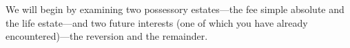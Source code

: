 
We will begin by examining two possessory estates---the fee simple
absolute and the life estate---and two future interests (one of
which you have already encountered)---the reversion and the
remainder.

